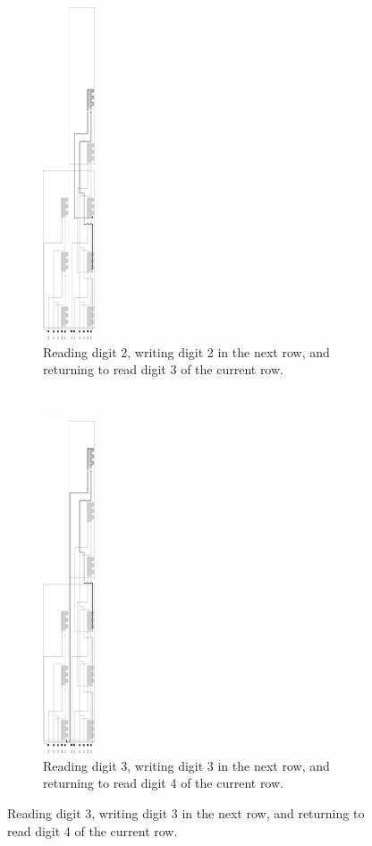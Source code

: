 \begin{figure}[H]
\begin{subfigure}[t]{0.2\textwidth}
        \includegraphics[width=0.6in]{counter_read_digit2_return_read_digit3_general_case3_middle_level}
        \caption{\label{fig:counter_read_digit2_return_read_digit3_general_case3_middle_level} Reading digit 2, writing digit 2 in the next row, and returning to read digit 3 of the current row. }
    \end{subfigure}%
    ~
    \begin{subfigure}[t]{0.2\textwidth}
        \centering
        \includegraphics[width=0.6in]{counter_read_digit3_return_read_digit1_general_case3_middle_level}
        \caption{\label{fig:counter_read_digit3_return_read_digit1_general_case3_middle_level} Reading digit 3, writing digit 3 in the next row, and returning to read digit 4 of the current row.}
    \end{subfigure}%


\end{figure}
